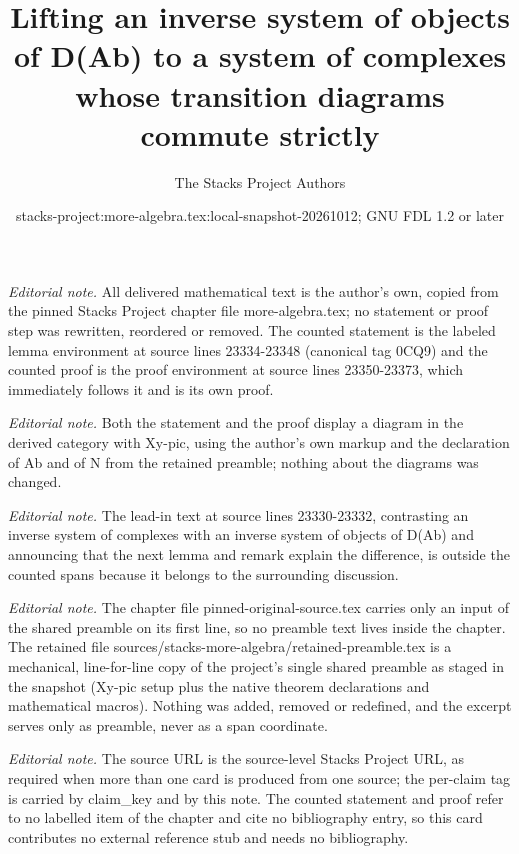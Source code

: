 \documentclass[10pt,a4paper]{amsart}
\title{Lifting an inverse system of objects of D(Ab) to a system of complexes whose transition diagrams commute strictly}
\author{The Stacks Project Authors}
\date{stacks-project:more-algebra.tex:local-snapshot-20261012; GNU FDL 1.2 or later}
\theoremstyle{plain}
\theoremstyle{definition}
\theoremstyle{remark}
\numberwithin{equation}{subsection}
\begin{document}
\maketitle
\setcounter{subsection}{1}
\noindent\textit{Editorial note.} All delivered mathematical text is the author's own, copied from the pinned Stacks Project chapter file more-algebra.tex; no statement or proof step was rewritten, reordered or removed. The counted statement is the labeled lemma environment at source lines 23334-23348 (canonical tag 0CQ9) and the counted proof is the proof environment at source lines 23350-23373, which immediately follows it and is its own proof.\par\medskip
\noindent\textit{Editorial note.} Both the statement and the proof display a diagram in the derived category with Xy-pic, using the author's own markup and the declaration of Ab and of N from the retained preamble; nothing about the diagrams was changed.\par\medskip
\noindent\textit{Editorial note.} The lead-in text at source lines 23330-23332, contrasting an inverse system of complexes with an inverse system of objects of D(Ab) and announcing that the next lemma and remark explain the difference, is outside the counted spans because it belongs to the surrounding discussion.\par\medskip
\noindent\textit{Editorial note.} The chapter file pinned-original-source.tex carries only an input of the shared preamble on its first line, so no preamble text lives inside the chapter. The retained file sources/stacks-more-algebra/retained-preamble.tex is a mechanical, line-for-line copy of the project's single shared preamble as staged in the snapshot (Xy-pic setup plus the native theorem declarations and mathematical macros). Nothing was added, removed or redefined, and the excerpt serves only as preamble, never as a span coordinate.\par\medskip
\noindent\textit{Editorial note.} The source URL is the source-level Stacks Project URL, as required when more than one card is produced from one source; the per-claim tag is carried by claim\_key and by this note. The counted statement and proof refer to no labelled item of the chapter and cite no bibliography entry, so this card contributes no external reference stub and needs no bibliography.\par\medskip
\end{document}
